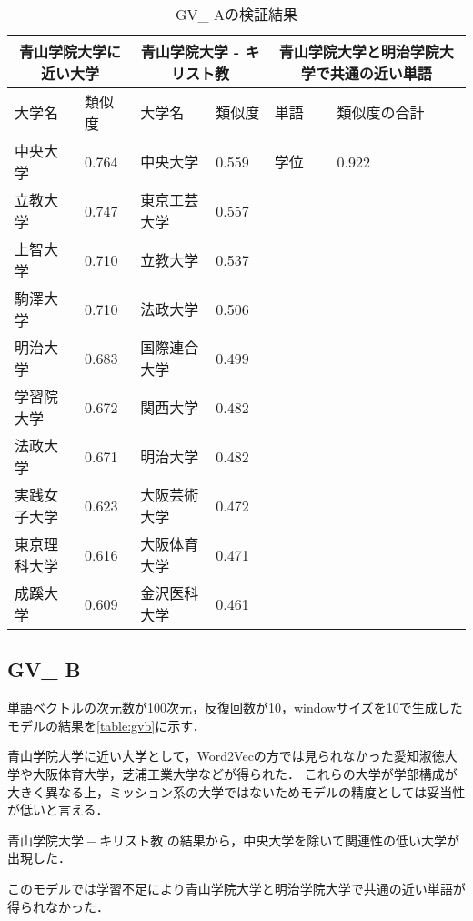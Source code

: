 \begin{table}[H]
\caption{GV\_ Aの検証結果}
\centering
\footnotesize
\begin{tabular}{ll|ll|ll}
\hline
\multicolumn{2}{c}{青山学院大学に近い大学} & \multicolumn{2}{c}{青山学院大学 - キリスト教} & \multicolumn{2}{c}{青山学院大学と明治学院大学で共通の近い単語}
\\ \hline
大学名 & 類似度 & 大学名 & 類似度 & 単語 & 類似度の合計
\\ \hline \hline
中央大学 & 0.764 & 中央大学 & 0.559 & 学位 & 0.922\\
立教大学 & 0.747 & 東京工芸大学 & 0.557 & & \\
上智大学 & 0.710 & 立教大学 & 0.537 & & \\
駒澤大学 & 0.710 & 法政大学 & 0.506 & & \\
明治大学 & 0.683 & 国際連合大学 & 0.499 & & \\
学習院大学 & 0.672 & 関西大学 & 0.482 & & \\
法政大学 & 0.671 & 明治大学 & 0.482 & & \\
実践女子大学 & 0.623 & 大阪芸術大学 & 0.472 & & \\
東京理科大学 & 0.616 & 大阪体育大学 & 0.471 & & \\
成蹊大学 & 0.609 & 金沢医科大学 & 0.461 & & \\ \hline
\end{tabular}
\label{table:gva}
\end{table}


\subsection{GV\_ B}
単語ベクトルの次元数が100次元，反復回数が10，windowサイズを10で生成したモデルの結果を\ref{table:gvb}に示す．

青山学院大学に近い大学として，Word2Vecの方では見られなかった愛知淑徳大学や大阪体育大学，芝浦工業大学などが得られた．
これらの大学が学部構成が大きく異なる上，ミッション系の大学ではないためモデルの精度としては妥当性が低いと言える．

$ 青山学院大学 - キリスト教 $ の結果から，中央大学を除いて関連性の低い大学が出現した．

このモデルでは学習不足により青山学院大学と明治学院大学で共通の近い単語が得られなかった．


